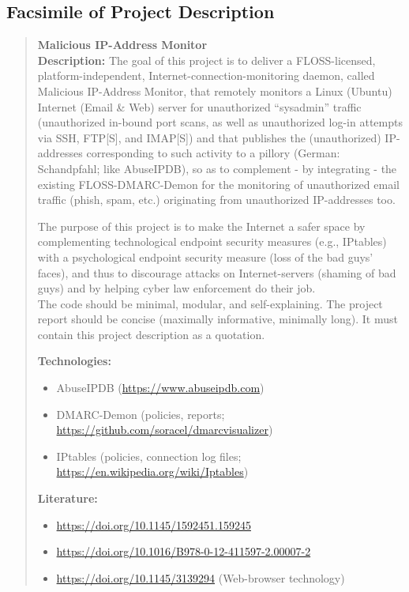 \documentclass{article}
\begin{document}
    \subsection{Facsimile of Project Description}\label{subsec:facsimile-of-project-description}
    \begin{quote}
        \textbf{Malicious IP-Address Monitor}\\
        \textbf{Description:} The goal of this project is to deliver a FLOSS-licensed, platform-independent, Internet-connection-monitoring daemon, called Malicious IP-Address Monitor, that remotely monitors a Linux (Ubuntu) Internet (Email \& Web) server for unauthorized “sysadmin” traffic (unauthorized in-bound port scans, as well as unauthorized log-in attempts via SSH, FTP[S], and IMAP[S]) and that publishes the (unauthorized) IP-addresses corresponding to such activity to a pillory (German: Schandpfahl; like AbuseIPDB), so as to complement - by integrating - the existing FLOSS-DMARC-Demon for the monitoring of unauthorized email traffic (phish, spam, etc.) originating from unauthorized IP-addresses too.

        \noindent The purpose of this project is to make the Internet a safer space by complementing technological endpoint security measures (e.g., IPtables) with a psychological endpoint security measure (loss of the bad guys' faces), and thus to discourage attacks on Internet-servers (shaming of bad guys) and by helping cyber law enforcement do their job.\\

        \noindent The code should be minimal, modular, and self-explaining.
        The project report should be concise (maximally informative, minimally long).
        It must contain this project description as a quotation.

        \textbf{Technologies:}
        \begin{itemize}
            \item AbuseIPDB (\url{https://www.abuseipdb.com})
            \item DMARC-Demon (policies, reports; \url{https://github.com/soracel/dmarcvisualizer})
            \item IPtables (policies, connection log files; \url{https://en.wikipedia.org/wiki/Iptables})
        \end{itemize}

        \textbf{Literature:}
        \begin{itemize}
            \item \url{https://doi.org/10.1145/1592451.159245}
            \item \url{https://doi.org/10.1016/B978-0-12-411597-2.00007-2}
            \item \url{https://doi.org/10.1145/3139294} (Web-browser technology)
        \end{itemize}


\end{quote}
\end{document}
